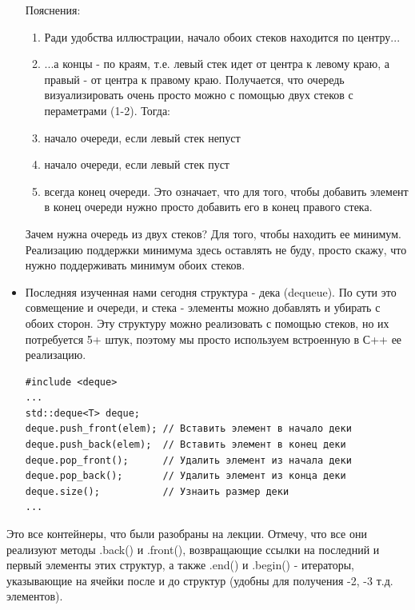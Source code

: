 \documentclass[a4paper,12pt]{article}
\begin{document}
\begin{itemize}
	      Пояснения:
	      \begin{enumerate}
		      \item Ради удобства иллюстрации, начало обоих стеков находится по центру...
		      \item ...а концы - по краям, т.е. левый стек идет от центра к левому краю, а правый -
		            от центра к правому краю.
		            Получается, что очередь визуализировать очень просто можно с помощью
		            двух стеков с пераметрами (1-2). Тогда:
		      \item начало очереди, если левый стек непуст
		      \item начало очереди, если левый стек пуст
		      \item всегда конец очереди. Это означает, что для того, чтобы добавить элемент в конец
		            очереди нужно просто добавить его в конец правого стека.
	      \end{enumerate}

	      Зачем нужна очередь из двух стеков? Для того, чтобы находить ее минимум. Реализацию
	      поддержки минимума здесь оставлять не буду, просто скажу, что нужно поддерживать минимум
	      обоих стеков.

	\item Последняя изученная нами сегодня структура - дека (dequeue). По сути это совмещение
	      и очереди, и стека - элементы можно добавлять и убирать с обоих сторон. Эту структуру
	      можно реализовать с помощью стеков, но их потребуется 5+ штук, поэтому мы просто используем
	      встроенную в С++ ее реализацию.
	      \begin{verbatim}
#include <deque>
...
std::deque<T> deque;
deque.push_front(elem); // Вставить элемент в начало деки
deque.push_back(elem);  // Вставить элемент в конец деки
deque.pop_front();      // Удалить элемент из начала деки
deque.pop_back();       // Удалить элемент из конца деки
deque.size();           // Узнаить размер деки
...
\end{verbatim}

\end{itemize}

Это все контейнеры, что были разобраны на лекции. Отмечу, что все они реализуют методы
.back() и .front(), возвращающие ссылки на последний и первый элементы этих структур,
а также .end() и .begin() - итераторы, указывающие на ячейки после и до структур (удобны
для получения -2, -3 т.д. элементов).
\end{document}
